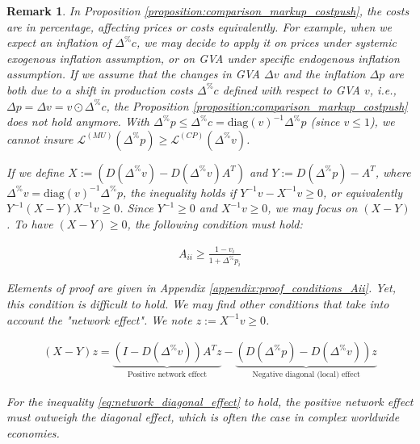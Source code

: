 \documentclass{article}
\newtheorem{remark}{Remark}
\begin{document}
\begin{remark}
\label{remark:warning_cost_inflation}
In Proposition \ref{proposition:comparison_markup_costpush}, the costs are in percentage, affecting prices or costs equivalently. For example, when we expect an inflation of $\Delta^{\%} c$, we may decide to apply it on prices under systemic exogenous inflation assumption, or on GVA under specific endogenous inflation assumption. If we assume that the changes in GVA $\Delta v$ and the inflation $\Delta p$ are both due to a shift in production costs $\Delta^{\%} c$ defined with respect to GVA $v$, i.e., $\Delta  p = \Delta v = v \odot \Delta^{\%} c$, the Proposition \ref{proposition:comparison_markup_costpush} does not hold anymore. With $\Delta^{\%}  p \leq \Delta^{\%} c= \text{diag}(v)^{-1} \Delta^{\%}  p$ (since $v \leq 1$), we cannot insure $\mathcal{L}^{(MU)}(\Delta^{\%} p) \geq \mathcal{L}^{(CP)}(\Delta^{\%} v)$. 

\vspace{0.1cm}

If we define $X := (D(\Delta^{\%} v) - D(\Delta^{\%} v) A^T)$ and $Y := D(\Delta^{\%} p) - A^T$, where $\Delta^{\%} v= \text{diag}(v)^{-1} \Delta^{\%}  p$, the inequality holds if $Y^{-1}v - X^{-1}v \geq 0$, or equivalently $Y^{-1}(X-Y)X^{-1}v \geq 0$. Since $Y^{-1} \geq 0$ and $X^{-1}v \geq 0$, we may focus on $(X-Y)$. To have $(X-Y) \geq 0$, the following condition must hold:

\begin{align}
A_{ii} \geq \frac{1 - v_i}{1 + \Delta^{\%} p_i}
\label{eq:conditions_Aii}
\end{align}

\noindent Elements of proof are given in Appendix \ref{appendix:proof_conditions_Aii}. Yet, this condition is difficult to hold. We may find other conditions that take into account the "network effect". We note $z:=X^{-1}v \geq 0$. 

\begin{align}
(X-Y)z = \underbrace{(I - D(\Delta^{\%} v))A^Tz}_{\text{Positive network effect}} - \underbrace{(D(\Delta^{\%} p) - D(\Delta^{\%} v)) z}_{\text{Negative diagonal (local) effect}}
\label{eq:network_diagonal_effect}
\end{align}

\noindent For the inequality \eqref{eq:network_diagonal_effect} to hold, the positive network effect must outweigh the diagonal effect, which is often the case in complex worldwide economies. 

\end{remark}
\end{document}
